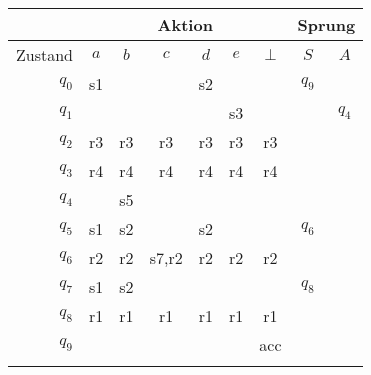 \documentclass[border=0.2cm, convert={density=600}]{standalone}
\begin{document}

\begin{tabular}{|r|cccccc|cc|}
	\hline\rowcolor{lightgray}
	& \multicolumn{6}{c|}{Aktion} & \multicolumn{2}{c|}{Sprung}\\
	\hline\rowcolor{lightgray}
	Zustand & $a$ & $b$ & $c$ & $d$ & $e$ & $\bot$ &  $S$  &  $A$ \\
	\hline\rowcolor{lightergray}
	$q_0$ & s1 &    &       & s2 &    &     & $q_9$ &      \\ \rowcolor{lightgray}
	$q_1$ &    &    &       &    & s3 &     &       & $q_4$\\ \rowcolor{lightergray}
	$q_2$ & r3 & r3 &   r3  & r3 & r3 & r3  &       &      \\ \rowcolor{lightgray}
	$q_3$ & r4 & r4 &   r4  & r4 & r4 & r4  &       &      \\ \rowcolor{lightergray}
	$q_4$ &    & s5 &       &    &    &     &       &      \\ \rowcolor{lightgray}
	$q_5$ & s1 & s2 &       & s2 &    &     & $q_6$ &      \\ \rowcolor{lightergray}
	$q_6$ & r2 & r2 & s7,r2 & r2 & r2 & r2  &       &      \\ \rowcolor{lightgray}
	$q_7$ & s1 & s2 &       &    &    &     & $q_8$ &      \\ \rowcolor{lightergray}
	$q_8$ & r1 & r1 &   r1  & r1 & r1 & r1  &       &      \\ \rowcolor{lightgray}
	$q_9$ &    &    &       &    &    & acc &       &      \\ \rowcolor{lightergray}
	\hline
\end{tabular}
\end{document}
